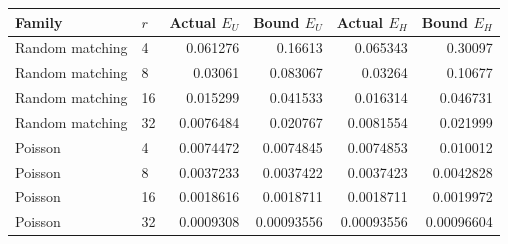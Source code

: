 \begin{tabular}{llrrrr}\toprule Family & $r$ & Actual $E_U$ & Bound $E_U$ & Actual $E_H$ & Bound $E_H$\\\midrule
Random matching & 4 & 0.061276 & 0.16613 & 0.065343 & 0.30097\\
Random matching & 8 & 0.03061 & 0.083067 & 0.03264 & 0.10677\\
Random matching & 16 & 0.015299 & 0.041533 & 0.016314 & 0.046731\\
Random matching & 32 & 0.0076484 & 0.020767 & 0.0081554 & 0.021999\\
Poisson & 4 & 0.0074472 & 0.0074845 & 0.0074853 & 0.010012\\
Poisson & 8 & 0.0037233 & 0.0037422 & 0.0037423 & 0.0042828\\
Poisson & 16 & 0.0018616 & 0.0018711 & 0.0018711 & 0.0019972\\
Poisson & 32 & 0.0009308 & 0.00093556 & 0.00093556 & 0.00096604\\
\bottomrule\end{tabular}

